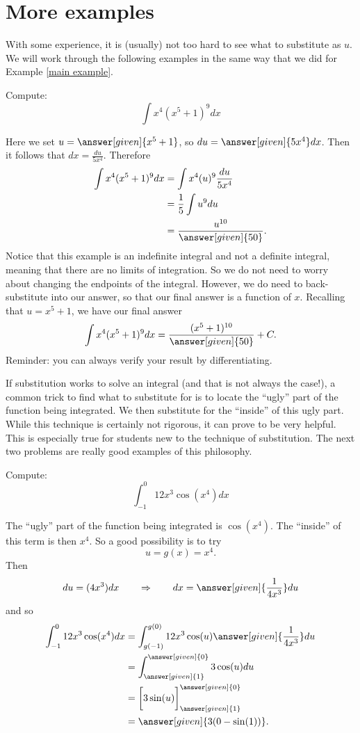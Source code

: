 \documentclass{ximera}
\begin{document}
\section{More examples}

With some experience, it is (usually) not too hard to see what to
substitute as $u$.  We will work through the following examples in the
same way that we did for Example \ref{main example}.
\begin{example}
Compute:
\[
\int x^4(x^5+1)^{9} dx
\]
\begin{explanation}
Here we set $u =  \answer[given]{x^5+1}$, so $du =  \answer[given]{5x^4} dx$.  Then
it follows that $dx=\frac{du}{5x^4}$. Therefore
\begin{align*}
  \int x^4(x^5+1)^{9} dx &= \int x^4 (u)^{9} \frac{du}{5x^4} \\
  &= \frac{1}{5} \int u^{9} du\\
&=\frac{u^{10}}{ \answer[given]{50}}.
\end{align*}
Notice that this example is an indefinite integral and not a definite
integral, meaning that there are no limits of integration.  So we do
not need to worry about changing the endpoints of the integral.  However,
we do need to back-substitute into our answer, so that our final
answer is a function of $x$.  Recalling that $u= x^5+1$, we have
our final answer
\[
\int x^4(x^5+1)^{9} dx= \frac{(x^5+1)^{10}}{\answer[given]{50}}+C.
\]
Reminder: you can always verify your result by differentiating.

\end{explanation}
\end{example}


If substitution works to solve an integral (and that is not always the
case!), a common trick to find what to substitute for is to locate the
``ugly'' part of the function being integrated.  We then substitute
for the ``inside'' of this ugly part.  While this technique is
certainly not rigorous, it can prove to be very helpful.  This is
especially true for students new to the technique of substitution.
The next two problems are really good examples of this philosophy.

\begin{example}
Compute:
\[
\int_{-1}^0 12x^3 \cos({x^4}) dx
\]
\begin{explanation}
The ``ugly'' part of the function being integrated is $\cos({x^4})$.  The
``inside'' of this term is then $x^4$.  So a good possibility is to
try
\[
u =g(x)= x^4.
\]
Then
\[
du = (4x^3) dx  \qquad  \Rightarrow \qquad  dx = \answer[given]{\frac{1}{4x^3}} du
\]
and so
\begin{align*}
\int_{-1}^0 12x^3 \cos({x^4}) dx &= \int_{g(-1)}^{g(0)} 12 x^3 \cos({u}) \answer[given]{\frac{1}{4x^3}} du  \\
&= \int_{\answer[given]{1}}^{\answer[given]{0}} 3 \cos({u}) du  \\
&= \bigg[ 3\sin({u}) \bigg]_{\answer[given]{1}}^{\answer[given]{0}}  \\
&= \answer[given]{3(0-\sin({1}))}.
\end{align*}
\end{explanation}
\end{example}
\end{document}
